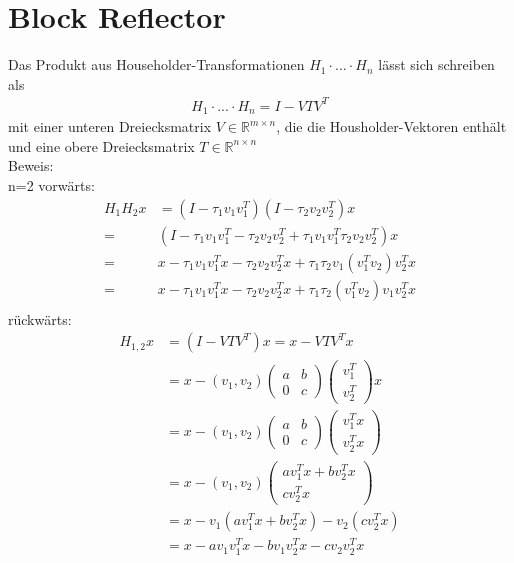 \chapter{Block Reflector}
Das Produkt aus Householder-Transformationen $H_1 \cdot ... \cdot H_n$ lässt sich schreiben als 
\begin{align*}
	H_1 \cdot ... \cdot H_n = I - VTV^T
\end{align*}
mit einer unteren Dreiecksmatrix $V \in \mathbb{R}^{m \times n}$, die die Housholder-Vektoren enthält und eine obere Dreiecksmatrix $T \in \mathbb{R}^{n \times n}$ \cite{Joffrain:2006:AHT:1141885.1141886}\\
Beweis:\\
n=2
vorwärts: 
\begin{align*}
	H_1 H_2 x &= (I-\tau_1 v_1 v_1^T)(I-\tau_2 v_2 v_2^T)x\\
	= &(I - \tau_1 v_1 v_1^T - \tau_2 v_2 v_2^T +  \tau_1 v_1 v_1^T \tau_2 v_2 v_2^T )x\\
  = &x - \tau_1 v_1 v_1^T x - \tau_2 v_2 v_2^T x + \tau_1 \tau_2 v_1 (v_1^T v_2 )v_2^T x\\
  = &x - \tau_1 v_1 v_1^T x - \tau_2 v_2 v_2^T x + \tau_1 \tau_2 (v_1^T v_2 ) v_1 v_2^T x\\
\end{align*}
rückwärts:
\begin{align*}
H_{1,2} x &= (I - V T V^T) x = x - V T V^T x\\
&= x - (v_1, v_2)
\begin{pmatrix}
a & b \\ 0 & c
\end{pmatrix}
\begin{pmatrix}
v_1^T \\ v_2^T 
\end{pmatrix}
x\\
&= x - (v_1, v_2)
\begin{pmatrix}
a & b \\ 0 & c
\end{pmatrix}
\begin{pmatrix}
v_1^T x \\ v_2^T x
\end{pmatrix}\\
&= x - (v_1, v_2)
\begin{pmatrix}
a v_1^T x + b v_2^T x\\  c v_2^T x
\end{pmatrix}\\
&= x - v_1(a v_1^T x + b v_2^T x) - v_2 (c v_2^T x)\\
&= x - a v_1 v_1^T x - b v_1 v_2^T x - c v_2 v_2^T x
\end{align*}
